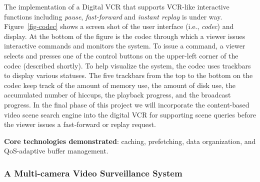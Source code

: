 The implementation of a
Digital VCR that supports VCR-like interactive functions including
{\em pause}, {\em fast-forward} and {\em instant replay} is under way.
Figure~\ref{fig-codec} shows a screen shot of the user interface
(i.e., {\em codec}) and display.
At the bottom of the figure is the codec through which a viewer
issues interactive commands and monitors the system.
To issue a command, a viewer selects and presses one
of the control buttons on the upper-left corner of
the codec (described shortly). To help visualize
the system, the codec uses trackbars to display various statuses. The five
trackbars from the top to the bottom on the codec keep track
of the amount of memory use, the amount of disk use,
the accumulated number of hiccups, the playback progress,
and the broadcast progress. 
In the final phase of this project we
will incorporate the content-based video scene search engine
into the digital VCR for supporting scene
queries before the viewer issues a fast-forward or replay request. 
                          

{\bf Core technologies demonstrated}: 
caching, prefetching, data 
organization, and QoS-adaptive buffer management.

\subsubsection{A Multi-camera Video Surveillance System}


